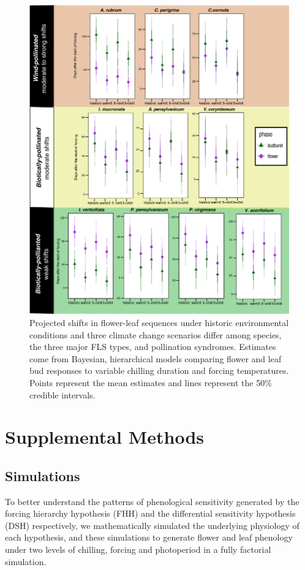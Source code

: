 \documentclass{article}\usepackage[]{graphicx}\usepackage[]{color}
\begin{document}
 \begin{figure}[!ht]
    \centering
 \includegraphics[width=\textwidth]{..//Plots/Flobuds_manuscript_figs/climpredictions.jpg}
    \caption{Projected shifts in flower-leaf sequences under historic environmental conditions and three climate change scenarios differ among species, the three major FLS types, and pollination syndromes. Estimates come from Bayesian, hierarchical models comparing flower and leaf bud responses to variable chilling duration and forcing temperatures. Points represent the mean estimates and lines represent the 50\% credible intervals.}
    \label{fig:preddy_sp}
\end{figure}

\pagebreak[4]

\section*{Supplemental Methods}
\subsection*{Simulations}
\noident To better understand the patterns of phenological sensitivity generated by the forcing hierarchy hypothesis (FHH) and the differential sensitivity hypothesis (DSH) respectively, we mathematically simulated the underlying physiology of each hypothesis, and these simulations to generate flower and leaf phenology under two levels of chilling, forcing and photoperiod in a fully factorial simulation.\\
\end{document}
